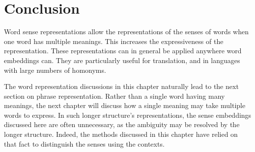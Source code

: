 \documentclass[12pt,parskip]{komatufte}
\begin{document}
%



\section{Conclusion}

Word sense representations allow the representations of the senses of words when one word has multiple meanings.
This increases the expressiveness of the representation.
These representations can in general be applied anywhere word embeddings can.
They are particularly useful for translation,
and in languages with large numbers of homonyms.

The word representation discussions in this chapter naturally lead to the next section on phrase representation. Rather than a single word having many meanings, the next chapter will discuss how a single meaning may take multiple words to express.
In such longer structure's representations, the sense embeddings discussed here are often unnecessary,
as the ambiguity may be resolved by the longer structure.
Indeed, the methods discussed in this chapter have relied on that fact to distinguish the senses using the contexts.
\end{document}
